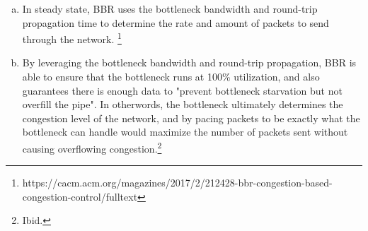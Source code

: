 \documentclass[11pt]{article}
\begin{document}
\begin{enumerate}[(a)]
\begin{itemize}
      \end{itemize}
    \item
      In steady state, BBR uses the bottleneck bandwidth and round-trip propagation
      time to determine the rate and amount of packets to send through the network.
      \footnote{https://cacm.acm.org/magazines/2017/2/212428-bbr-congestion-based-congestion-control/fulltext}
    \item
      By leveraging the bottleneck bandwidth and round-trip propagation, BBR
      is able to ensure that the bottleneck runs at 100\% utilization, and
      also guarantees there is enough data to "prevent bottleneck starvation
      but not overfill the pipe". In otherwords, the bottleneck ultimately
      determines the congestion level of the network, and by pacing packets
      to be exactly what the bottleneck can handle would maximize the number
      of packets sent without causing overflowing congestion.\footnote{Ibid.}
  \end{enumerate}
\end{document}
